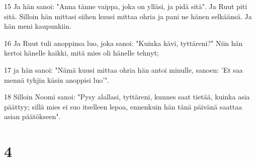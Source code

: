 \par 15 Ja hän sanoi: "Anna tänne vaippa, joka on ylläsi, ja pidä sitä". Ja Ruut piti sitä. Silloin hän mittasi siihen kuusi mittaa ohria ja pani ne hänen selkäänsä. Ja hän meni kaupunkiin.
\par 16 Ja Ruut tuli anoppinsa luo, joka sanoi: "Kuinka kävi, tyttäreni?" Niin hän kertoi hänelle kaikki, mitä mies oli hänelle tehnyt;
\par 17 ja hän sanoi: "Nämä kuusi mittaa ohria hän antoi minulle, sanoen: 'Et saa mennä tyhjin käsin anoppisi luo'".
\par 18 Silloin Noomi sanoi: "Pysy alallasi, tyttäreni, kunnes saat tietää, kuinka asia päättyy; sillä mies ei suo itselleen lepoa, ennenkuin hän tänä päivänä saattaa asian päätökseen".

\chapter{4}


